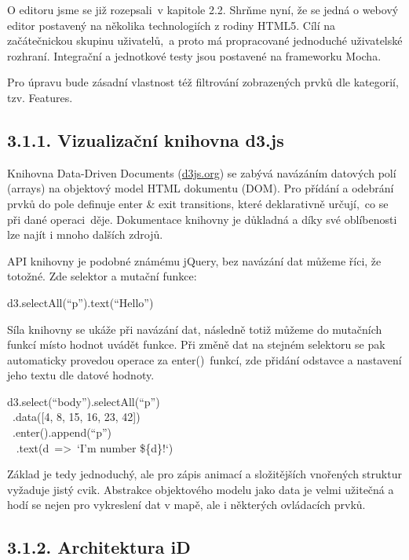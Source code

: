 O editoru jsme se již rozepsali~v kapitole 2.2. Shrňme nyní, že se jedná o webový editor postavený na několika technologiích z rodiny HTML5. Cílí na začátečnickou skupinu uživatelů,~a proto má propracované jednoduché uživatelské rozhraní. Integrační a jednotkové testy jsou postavené na frameworku Mocha.

Pro úpravu bude zásadní vlastnost též filtrování zobrazených prvků dle kategorií, tzv. Features.

\subsection{3.1.1. Vizualizační knihovna d3.js}\label{vizualizaux10dnuxed-knihovna-d3.js}

Knihovna Data-Driven Documents (\href{}{d3js.org}) se zabývá navázáním datových polí (arrays) na objektový model HTML dokumentu (DOM). Pro přídání a odebrání prvků do pole definuje enter \& exit transitions, které deklarativně určují,~co se při dané operaci~děje. Dokumentace knihovny je důkladná a díky své oblíbenosti lze najít i mnoho dalších zdrojů.

API knihovny je podobné známému jQuery, bez navázání dat můžeme říci, že totožné. Zde selektor a mutační funkce:

d3.selectAll(``p'').text(``Hello'')

Síla knihovny se ukáže při navázání dat, následně totiž můžeme do mutačních funkcí místo hodnot uvádět funkce. Při změně dat na stejném selektoru se pak automaticky provedou operace za enter()~funkcí, zde přidání odstavce a nastavení jeho textu dle datové hodnoty.

d3.select(``body'').selectAll(``p'')\\
\hspace*{0.333em} ~.data({[}4, 8, 15, 16, 23, 42{]})\\
\hspace*{0.333em} ~.enter().append(``p'')\\
\hspace*{0.333em} ~ .text(d~=\textgreater{}~`I'm number \$\{d\}!`)

Základ je tedy jednoduchý, ale pro zápis animací a složitějších vnořených struktur vyžaduje jistý cvik. Abstrakce objektového modelu jako data je velmi užitečná a hodí se nejen pro vykreslení dat v mapě, ale i některých ovládacích prvků.

\subsection{3.1.2. Architektura iD}\label{architektura-id}

